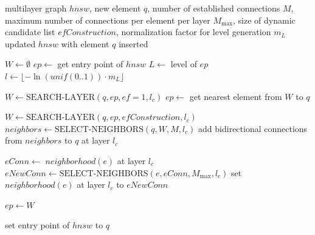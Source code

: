 \begin{algorithm}[H]
    \caption{INSERT \cite{Malkov-Yashunin-2016}}
    \label{alg:hnsw-1}
    \begin{algorithmic}[1]
        \Require multilayer graph $hnsw$, new element $q$, number of established connections $M$, maximum number of connections per element per layer $M_{\text{max}}$, size of dynamic candidate list $efConstruction$, normalization factor for level generation $m_L$
        \Ensure updated $hnsw$ with element $q$ inserted
        
        \State $W \gets \emptyset$ 
        \State $ep \gets$ get entry point of $hnsw$
        \State $L \gets$ level of $ep$ 
        \State $l \gets \lfloor -\ln(\text{$unif$}(0..1)) \cdot m_L \rfloor$ 
        
            \State $W \gets \text{SEARCH-LAYER}(q, ep, ef=1, l_c)$
            \State $ep \gets$ get nearest element from $W$ to $q$
        \EndFor
        
            \State $W \gets \text{SEARCH-LAYER}(q, ep, efConstruction, l_c)$
            \State $neighbors \gets \text{SELECT-NEIGHBORS}(q, W, M, l_c)$ 
            \State add bidirectional connections from $neighbors$ to $q$ at layer $l_c$
            
             
                \State $eConn \gets$ $neighborhood(e)$ at layer $l_c$
                 
                    \State $eNewConn \gets \text{SELECT-NEIGHBORS}(e, eConn, M_{\text{max}}, l_c)$ 
                    \State set $neighborhood(e)$ at layer $l_c$ to $eNewConn$
                \EndIf
            \EndFor
            
            \State $ep \gets W$
        \EndFor
        
            \State set entry point of $hnsw$ to $q$
        \EndIf
    \end{algorithmic}
\end{algorithm}